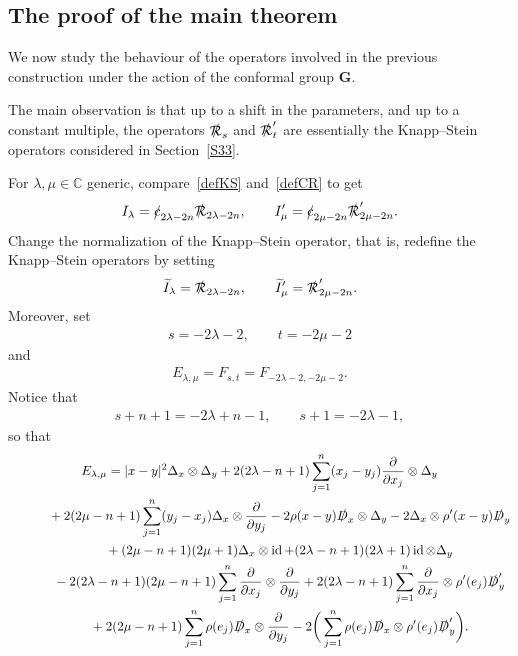 \documentclass[10pt,a4paper]{amsart}
\DeclareMathOperator{\id}{id}
\newcommand{\fsl}[1]{{\slashed{#1}}} %
\numberwithin{equation}{section}
\begin{document}
\subsection{The proof of the main theorem}
We now study the behaviour of the operators involved in the previous construction under the action of the conformal group $\mathbf G$.

The main observation is that up to a shift in the parameters, and up to a constant multiple, the operators $\fsl{\mathcal R}_s$ and $\fsl{\mathcal R}'_t$ are essentially the Knapp--Stein operators considered in Section~\ref{S33}.

For $\lambda, \mu\in \mathbb C$ generic, compare~\eqref{defKS} and~\eqref{defCR} to get
\begin{gather*}
I_\lambda = \fsl{c}_{2\lambda- 2n} \fsl{\mathcal R}_{2\lambda- 2n}, \qquad I'_\mu = \fsl{c}_{2\mu-2n} \fsl{\mathcal R}'_{2\mu-2n}. \end{gather*}
 Change the normalization of the Knapp--Stein operator, that is, redefine the
 Knapp--Stein ope\-ra\-tors by setting
 \begin{gather*}
 \widetilde I_\lambda = \fsl{\mathcal R}_{2\lambda-2n},\qquad \widetilde I'_\mu = \fsl{\mathcal R}'_{2\mu-2n}.
 \end{gather*}
 Moreover, set
 \begin{gather*}
 s= -2\lambda-2,\qquad t=-2\mu-2
 \end{gather*}
 and
 \begin{gather*}
 E_{\lambda,\mu} = F_{s,t} =F_{-2\lambda-2, -2\mu-2}.
 \end{gather*}
Notice that
\begin{gather*}
s+n+1 =-2\lambda+n-1, \qquad
s+1 = -2\lambda-1,
\end{gather*}
so that
\begin{gather}
E_{\lambda,\mu} = \vert x-y\vert^2 \Delta_x\otimes \Delta_y
+2(2\lambda-n+1) \sum_{j=1}^n (x_j-y_j) \frac{\partial}{\partial x_j} \otimes \Delta_y\nonumber
\\ \hphantom{E_{\lambda,\mu} =}
{}+ 2(2\mu-n+1) \sum_{j=1}^n (y_j-x_j) \Delta_x\otimes \frac{\partial}{\partial y_j}
-2\rho(x-y)\fsl{D}_x\otimes \Delta_y - 2 \Delta_x\otimes \rho'(x-y) \fsl{D}_y\nonumber
\\ \hphantom{E_{\lambda,\mu} =}
{}+(2\mu-n+1)(2\mu+1) \Delta_x\otimes \id + (2\lambda-n+1) (2\lambda+1)\id\otimes\Delta_y\nonumber
\\ \hphantom{E_{\lambda,\mu} =}
{} -2(2\lambda-n+1)(2\mu-n+1) \sum_{j=1}^n \frac{\partial}{\partial x_j} \otimes \frac{\partial}{\partial y_j}
+2(2\lambda-n+1) \sum_{j=1}^n \frac{\partial}{\partial x_j}\otimes \rho'(e_j)\fsl{D}'_y\nonumber
\\ \hphantom{E_{\lambda,\mu} =}
{}+2(2\mu-n+1)\sum_{j=1}^n \rho(e_j)\fsl{D}_x\otimes \frac{\partial}{\partial y_j}
- 2\bigg(\sum_{j=1}^n \rho(e_j)\fsl{D}_x\otimes \rho'(e_j)\fsl{D}'_y\bigg).\label{Elambdamu}
\end{gather}
\end{document}
